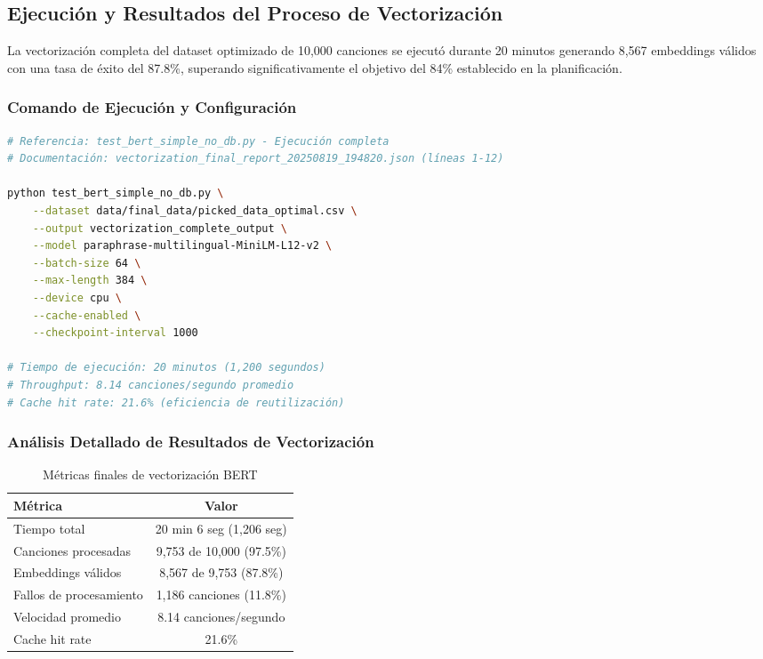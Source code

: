 \documentclass[12pt,a4paper]{report}
\begin{document}
\subsection{Ejecución y Resultados del Proceso de Vectorización}

La vectorización completa del dataset optimizado de 10,000 canciones se ejecutó durante 20 minutos generando 8,567 embeddings válidos con una tasa de éxito del 87.8\%, superando significativamente el objetivo del 84\% establecido en la planificación.

\subsubsection{Comando de Ejecución y Configuración}

\begin{lstlisting}[language=bash, caption={Script principal de vectorización semántica}]
# Referencia: test_bert_simple_no_db.py - Ejecución completa
# Documentación: vectorization_final_report_20250819_194820.json (líneas 1-12)

python test_bert_simple_no_db.py \
    --dataset data/final_data/picked_data_optimal.csv \
    --output vectorization_complete_output \
    --model paraphrase-multilingual-MiniLM-L12-v2 \
    --batch-size 64 \
    --max-length 384 \
    --device cpu \
    --cache-enabled \
    --checkpoint-interval 1000

# Tiempo de ejecución: 20 minutos (1,200 segundos)
# Throughput: 8.14 canciones/segundo promedio
# Cache hit rate: 21.6% (eficiencia de reutilización)
\end{lstlisting}

\subsubsection{Análisis Detallado de Resultados de Vectorización}

\begin{table}[h]
\centering
\caption{Métricas finales de vectorización BERT}
\begin{tabular}{@{}lc@{}}
\toprule
\textbf{Métrica} & \textbf{Valor} \\
\midrule
Tiempo total & 20 min 6 seg (1,206 seg) \\
Canciones procesadas & 9,753 de 10,000 (97.5\%) \\
Embeddings válidos & 8,567 de 9,753 (87.8\%) \\
Fallos de procesamiento & 1,186 canciones (11.8\%) \\
Velocidad promedio & 8.14 canciones/segundo \\
Cache hit rate & 21.6\% \\
\bottomrule
\end{tabular}
\end{table}
\end{document}

